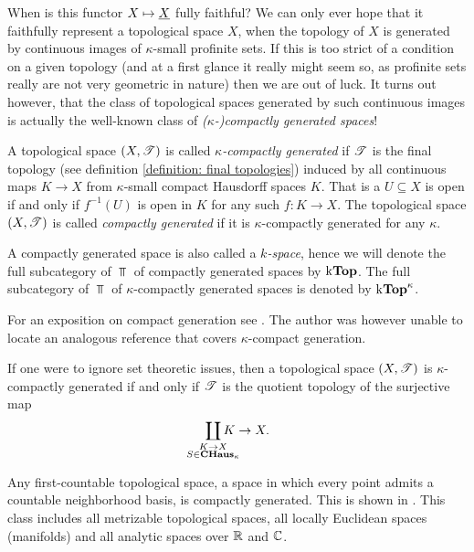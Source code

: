 When is this functor $X\mapsto \underline{X}$ fully faithful? We can only ever hope that it faithfully represent a topological space $X$, when the topology of $X$ is generated by continuous images of $\kappa$-small profinite sets. If this is too strict of a condition on a given topology (and at a first glance it really might seem so, as profinite sets really are not very geometric in nature) then we are out of luck. It turns out however, that the class of topological spaces generated by such continuous images is actually the well-known class of \emph{($\kappa$-)compactly generated spaces}!
\begin{definition}
	A topological space $(X, {\mathscr{T}})$ is called \emph{$\kappa$-compactly generated} if ${\mathscr{T}}$ is the final topology (see definition \ref{definition: final topologies}) induced by all continuous maps $K \to X$ from $\kappa$-small compact Hausdorff spaces $K$. That is a $U\subseteq X$ is open if and only if $f^{-1}(U)$ is open in $K$ for any such $f\colon K\to X$. The topological space $(X,{\mathscr{T}})$ is called \emph{compactly generated} if it is $\kappa$-compactly generated for any $\kappa$.
 
	A compactly generated space is also called a \emph{$k$-space}, hence we will denote the full subcategory of $\Top$ of compactly generated spaces by ${\mathrm{k}{{\mathbf{Top}}}}$. The full subcategory of $\Top$ of $\kappa$-compactly generated spaces is denoted by ${\mathrm{k}{{\mathbf{Top}}}^{\kappa}}$.
	
	For an exposition on compact generation see 
	\cite[Chap. 3.1]{compact-generation}. The author was however unable to locate an analogous reference that covers $\kappa$-compact generation.
\end{definition}

\begin{remark}
	If one were to ignore set theoretic issues, then a topological space $(X, {\mathscr{T}})$ is $\kappa$-compactly generated if and only if ${\mathscr{T}}$ is the quotient topology of the surjective map
		$$\smashoperator{\coprod_{\substack{K\to X\\ S\in\boundedCHaus{\kappa}}}} K \to X.$$
\end{remark}

\begin{example}
	Any first-countable topological space, \ie a space in which every point admits a countable neighborhood basis, is compactly generated. This is shown in \cite[Remark 1.6]{condenseddotpdf}. This class includes all metrizable topological spaces, all locally Euclidean spaces (\eg manifolds) and all analytic spaces over ${\mathbb{R}}$ and ${\mathbb{C}}$.
\end{example}

